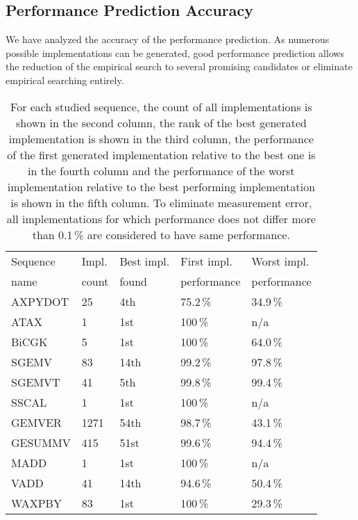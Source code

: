 \documentclass[final]{siamltex}
\begin{document}
{\subsection{Performance Prediction Accuracy}

We have analyzed the accuracy of the performance prediction. As numerous possible implementations can be generated, good performance prediction allows the reduction of the empirical search to several promising candidates or eliminate empirical searching entirely. 

\begin{table}
        \centering
        \small
        \begin{tabular}{|l|l|l|l|l|}
                \hline
                Sequence & Impl. & Best impl. & First impl. & Worst impl. \\
                name     & count & found      & performance & performance \\
                \hline
                AXPYDOT  & 25    & 4th         & 75.2\,\%    & 34.9\,\% \\
                ATAX     & 1     & 1st         & 100\,\%     & n/a \\
                BiCGK    & 5     & 1st         & 100\,\%     & 64.0\,\% \\
                SGEMV    & 83    & 14th        & 99.2\,\%    & 97.8\,\% \\
                SGEMVT   & 41    & 5th         & 99.8\,\%     & 99.4\,\% \\
                SSCAL    & 1     & 1st         & 100\,\%     & n/a \\
                GEMVER   & 1271  & 54th        & 98.7\,\%    & 43.1\,\% \\
                GESUMMV  & 415   & 51st        & 99.6\,\%    & 94.4\,\% \\
                MADD     & 1     & 1st         & 100\,\%     & n/a \\
                VADD     & 41    & 14th        & 94.6\,\%    & 50.4\,\% \\
                WAXPBY   & 83    & 1st         & 100\,\%    & 29.3\,\% \\
                \hline
        \end{tabular}
\caption{For each studied sequence, the count of all implementations is shown in the second column, the rank of the best generated implementation is shown in the third column, the performance of the first generated implementation relative to the best one is in the fourth column and the performance of the worst implementation relative to the best performing implementation is shown in the fifth column. To eliminate measurement error, all implementations for which performance does not differ more than 0.1\,\% are considered to have same performance.}
        \label{tab:prediction}
\end{table}

}
\end{document}
